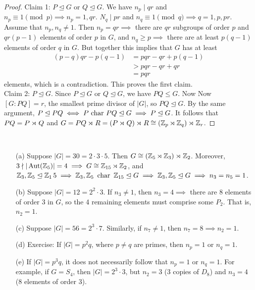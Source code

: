 \documentclass[11pt]{book}
\theoremstyle{definition}   \newtheorem{defn}[counter]{Definition} %
\newcommand{\nsg}{\mathrel{\unlhd}}   \newcommand{\ind}{\parindent24pt}   \newcommand{\vn}{\varnothing}
\newcommand{\vs}{\vspace{8pt}}
\numberwithin{counter}{chapter}
\begin{document}
\begin{proof}
Claim 1: $P \nsg G$ or $Q \nsg G$. We have $n_p \mid qr$ and $n_p \equiv 1 \pmod{p} \implies n_p = 1,qr$. $N_q \mid pr$ and $n_q \equiv 1 \pmod{q} \implies q = 1,p,pr$. Assume that $n_p,n_q \ne 1$. Then $n_p = qr \implies$ there are $qr$ subgroups of order $p$ and $qr(p-1)$ elements of order $p$ in $G$, and $n_q \geq p \implies$ there are at least $p(q-1)$ elements of order $q$ in $G$. But together this implies that $G$ has at least
	\begin{align*}
	(p-q)qr - p(q-1) &= pqr - qr + p(q-1) \\
	&> pqr - qr + qr \tag{$p > q, p-1 \geq r$} \\
	&= pqr
	\end{align*}
elements, which is a contradiction. This proves the first claim. \\

Claim 2: $P \nsg G$. Since $P \nsg G$ or $Q \nsg G$, we have $PQ \leq G$. Now Now $[G : PQ] = r$, the smallest prime divisor of $|G|$, so $PQ \nsg G$. By the same argument, $P \nsg PQ \iff P \car PQ \nsg G \implies P \nsg G$. It follows that $PQ = P \rtimes_{} Q$ and $G = PQ \rtimes_{}R = (P \rtimes_{} Q) \rtimes_{}R \cong (\operatorname{\mathbb{Z}}_p \rtimes_{} \operatorname{\mathbb{Z}}_q) \rtimes_{} \operatorname{\mathbb{Z}}_r$.
\end{proof}

\vs

\begin{example}
\
\begin{enumerate}
\item[(a)] Suppose $|G| = 30 = 2 \cdot 3 \cdot 5$. Then $G \cong (\operatorname{\mathbb{Z}}_5 \rtimes_{} \operatorname{\mathbb{Z}}_3) \rtimes_{} \operatorname{\mathbb{Z}}_2$. Moreover, $3 \nmid |\operatorname{\textnormal{Aut}}(\operatorname{\mathbb{Z}}_5)| = 4 \implies G \cong \operatorname{\mathbb{Z}}_{15} \rtimes_{} \operatorname{\mathbb{Z}}_2$, and $\z_3,\z_5 \nsg \z_15 \implies \z_3,\z_5 \car \z_{15} \nsg G \implies \z_3,\z_5 \nsg G \implies n_3=n_5=1$.
\item[(b)] Suppose $|G| = 12 = 2^2 \cdot 3$. If $n_3 \ne 1$, then $n_3 = 4 \implies $ there are $8$ elements of order 3 in $G$, so the 4 remaining elements must comprise some $P_2$. That is, $n_2 = 1$.
\item[(c)] Suppose $|G| = 56 = 2^3 \cdot 7$. Similarly, if $n_7 \ne 1$, then $n_7 = 8 \implies n_2 = 1$.
\item[(d)] Exercise: If $|G| = p^2 q$, where $p \ne q$ are primes, then $n_p = 1$ or $n_q = 1$.
\item[(e)] If $|G| = p^3 q$, it does not necessarily follow that $n_p = 1$ or $n_q = 1$. For example, if $G = S_4$, then $|G| = 2^3 \cdot 3$, but $n_2 = 3$ (3 copies of $D_8$) and $n_3 = 4$ (8 elements of order 3).
\end{enumerate}
\end{example}
\end{document}
